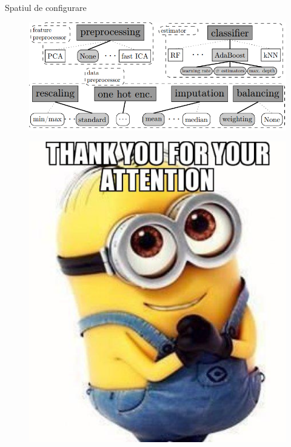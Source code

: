 \documentclass{beamer}
\begin{document}
	\begin{frame}{Spatiul de configurare}
		\begin{figure}[H]
			\centering
			\includegraphics[scale=0.6]{pipeline.PNG}
		\end{figure}	
	\end{frame}


	\begin{frame}{}
		\begin{figure}[H]
			\centering
			\includegraphics[scale=0.7]{multumesc.PNG}
		\end{figure}	
	\end{frame}
\end{document}
